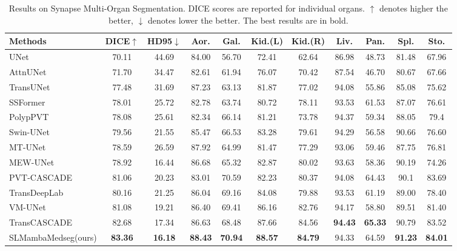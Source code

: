 \documentclass[letterpaper, 10 pt, conference]{ieeeconf}  %
\begin{document}
\begin{table}[h]
\footnotesize
\centering
\label{f1}
\begin{tabular}{l|cc|cccccccc}\hline
Methods & DICE$\uparrow$ & HD95$\downarrow$ &Aor.& Gal. &Kid.(L) &Kid.(R) &Liv. &Pan. &Spl. &Sto. \\\hline

UNet\cite{ronneberger2015unet} & 70.11& 44.69& 84.00 &56.70& 72.41& 62.64& 86.98& 48.73& 81.48& 67.96 \\
AttnUNet\cite{oktay2018attention}& 71.70& 34.47& 82.61& 61.94& 76.07& 70.42& 87.54& 46.70& 80.67& 67.66 \\
TransUNet\cite{chen2021transunet} & 77.48 &31.69& 87.23 &63.13 &81.87 &77.02 &94.08 &55.86& 85.08& 75.62	\\
SSFormer\cite{wang2022stepwise}& 78.01& 25.72&  82.78& 63.74& 80.72& 78.11& 93.53& 61.53& 87.07& 76.61 \\
PolypPVT\cite{dong2021polyp} & 78.08& 25.61&  82.34& 66.14& 81.21& 73.78& 94.37& 59.34& 88.05& 79.4 \\
Swin-UNet\cite{cao2021swinunet} & 79.56 & 21.55 & 85.47 &66.53 &83.28 &79.61& 94.29 &56.58& 90.66& 76.60	\\
MT-UNet\cite{wang2022mixed} & 78.59 &26.59& 87.92& 64.99& 81.47& 77.29& 93.06& 59.46& 87.75& 76.81\\
MEW-UNet\cite{ruan2022mew} & 78.92& 16.44& 86.68& 65.32& 82.87& 80.02& 93.63& 58.36& 90.19& 74.26\\
PVT-CASCADE\cite{rahman2023medical} & 81.06& 20.23& 83.01& 70.59& 82.23& 80.37& 94.08& 64.43& 90.1& 83.69 \\
TransDeepLab\cite{azad2022transdeeplab} & 80.16& 21.25& 86.04& 69.16& 84.08& 79.88& 93.53& 61.19& 89.00& 78.40\\
VM-UNet\cite{ruan2024vmunet} & 81.08& 19.21& 86.40& 69.41& 86.16& 82.76& 94.17& 58.80& 89.51& 81.40 \\
TransCASCADE\cite{rahman2023transcascade} & 82.68 &17.34 & 86.63 &68.48& 87.66& 84.56& \textbf{94.43}& \textbf{65.33}& 90.79& 83.52\\
\hline
SLMambaMedseg(ours) & \textbf{83.36}& \textbf{16.18}& \textbf{88.43}& \textbf{70.94}& \textbf{88.57}& \textbf{84.79}& 94.33& 64.59& \textbf{91.23}& \textbf{84.01} \\\hline
\end{tabular}
\caption{Results on Synapse Multi-Organ Segmentation. DICE scores are reported for individual organs. $\uparrow$ denotes higher the better, $\downarrow$ denotes lower the better. The best results are in bold.}
\label{table1}
\end{table}
\end{document}
